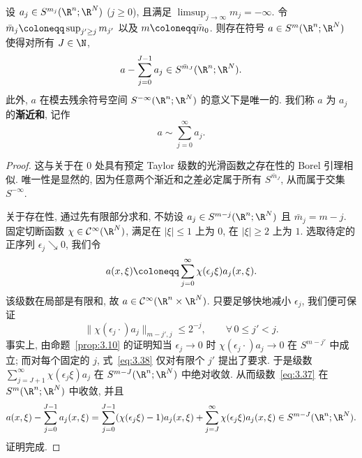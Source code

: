 \begin{proposition}[渐近和的存在性与唯一性]\label{prop:3.16}
设 $a_j \in S^{m_j}(\R^n; \R^N)$ ($j \ge 0$), 且满足 $\limsup_{j \to \infty} m_j = -\infty$. 令 $\bar{m}_j \defeq \sup_{j' \ge j} m_{j'}$ 以及 $m \defeq \bar{m}_0$. 则存在符号 $a \in S^m(\R^n; \R^N)$ 使得对所有 $J \in \N$,
\begin{equation}\label{eq:3.35}
    a - \sum_{j=0}^{J-1} a_j \in S^{\bar{m}_J}(\R^n; \R^N).
\end{equation}
此外, $a$ 在模去残余符号空间 $S^{-\infty}(\R^n; \R^N)$ 的意义下是唯一的. 我们称 $a$ 为 $a_j$ 的\textbf{渐近和}, 记作
\begin{equation}\label{eq:3.36}
    a \sim \sum_{j=0}^\infty a_j.
\end{equation}
\end{proposition}

\begin{proof}
这与关于在 $0$ 处具有预定 Taylor 级数的光滑函数之存在性的 Borel 引理相似. 唯一性是显然的, 因为任意两个渐近和之差必定属于所有 $S^{\bar{m}_J}$, 从而属于交集 $S^{-\infty}$.

关于存在性, 通过先有限部分求和, 不妨设 $a_j \in S^{m-j}(\R^n; \R^N)$ 且 $\bar{m}_j = m - j$. 固定切断函数 $\chi \in \Smooth(\R^N)$, 满足在 $|\xi| \le 1$ 上为 $0$, 在 $|\xi| \ge 2$ 上为 $1$. 选取待定的正序列 $\epsilon_j \searrow 0$, 我们令
\begin{equation}\label{eq:3.37}
    a(x, \xi) \defeq \sum_{j=0}^\infty \chi(\epsilon_j \xi) a_j(x, \xi).
\end{equation}
该级数在局部是有限和, 故 $a \in \Smooth(\R^n \times \R^N)$. 只要足够快地减小 $\epsilon_j$, 我们便可保证
\begin{equation}\label{eq:3.38}
    \|\chi(\epsilon_j \cdot) a_j\|_{m-j', j} \le 2^{-j}, \qquad \forall\,0 \le j' < j.
\end{equation}
事实上, 由命题~\ref{prop:3.10} 的证明知当 $\epsilon_j \to 0$ 时 $\chi(\epsilon_j \cdot) a_j \to 0$ 在 $S^{m-j'}$ 中成立; 而对每个固定的 $j$, 式~\eqref{eq:3.38} 仅对有限个 $j'$ 提出了要求. 于是级数 $\sum_{j=J+1}^\infty \chi(\epsilon_j \xi) a_j$ 在 $S^{m-J}(\R^n; \R^N)$ 中绝对收敛. 从而级数~\eqref{eq:3.37} 在 $S^m(\R^n; \R^N)$ 中收敛, 并且
\begin{equation}\label{eq:3.39}
    a(x, \xi) - \sum_{j=0}^{J-1} a_j(x, \xi) = \sum_{j=0}^{J-1} (\chi(\epsilon_j \xi) - 1) a_j(x, \xi) + \sum_{j=J}^\infty \chi(\epsilon_j \xi) a_j(x, \xi) \in S^{m-J}(\R^n; \R^N).
\end{equation}
证明完成.
\end{proof}

